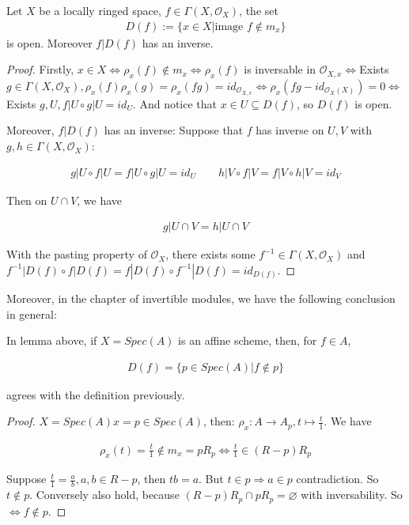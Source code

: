 \documentclass[Total.tex]{subfiles}
\begin{document}
			\begin{lemma}
				Let $X$ be a locally ringed space, $f\in \Gamma(X,\mathcal{O}_X)$, the set
				\begin{gather*}
					D(f):=\{x\in X|\mbox{image }f\notin m_x\}
				\end{gather*}
				is open. Moreover $f|D(f)$ has an inverse.
			\end{lemma}
			
			\begin{proof}
				Firstly, $x\in X\Leftrightarrow \rho_x(f)\notin m_x\Leftrightarrow \rho_x(f)$ is inversable in $\mathcal{O}_{X,x}\Leftrightarrow $Exists $g\in \Gamma(X,\mathcal{O}_X),\rho_x(f)\rho_x(g)=\rho_x(fg)=id_{\mathcal{O}_{X,x}}\Leftrightarrow \rho_x(fg-id_{\mathcal{O}_X(X)})=0\Leftrightarrow$ Exists $g,U,f|U\circ g|U=id_U$. And notice that $x\in U\subseteq D(f)$, so $D(f)$ is open. 
				
				Moreover, $f|D(f)$ has an inverse: Suppose that $f$ has inverse on $U,V$ with $g,h\in \Gamma(X,\mathcal{O}_X)$:
				
				\begin{gather*}
					g|U\circ f|U=f|U\circ g|U=id_U\qquad h|V\circ f|V=f|V\circ h|V=id_V
				\end{gather*}
				
				Then on $U\cap V$, we have
				
				\begin{gather*}
					g|U\cap V=h|U\cap V
				\end{gather*}
				
				With the pasting property of $\mathcal{O}_X$, there exists some $f^{-1}\in \Gamma(X,\mathcal{O}_X)$ and $f^{-1}|D(f)\circ f|D(f)=f|D(f)\circ f^{-1}|D(f)=id_{D(f)}$.
			\end{proof}
			
			Moreover, in the chapter of invertible modules, we have the following conclusion in general:
			
			\begin{lemma}
				In lemma above, if $X=Spec(A)$ is an affine scheme, then, for $f\in A$,
				
				\begin{gather*}
					D(f)=\{p\in Spec(A)|f\notin p\}
				\end{gather*}
				
				agrees with the definition previously.
			\end{lemma}
			
			\begin{proof}
				$X=Spec(A)x=p\in Spec(A)$, then: $\rho_x:A\rightarrow A_p,t\mapsto\frac{t}{1}$. We have
				
				\begin{gather*}
					\rho_x(t)=\frac{t}{1}\notin m_x=pR_p\Leftrightarrow \frac{t}{1}\in (R-p)R_p
				\end{gather*} 
				
				Suppose $\frac{t}{1}=\frac{a}{b},a,b\in R-p$, then $tb=a$. But $t\in p\Rightarrow a\in p$ contradiction. So $t\notin p$. Conversely also hold, because $(R-p)R_p\cap pR_p=\varnothing$ with inversability. So $\Leftrightarrow f\notin p$. 
				
			\end{proof}
			
\end{document}

